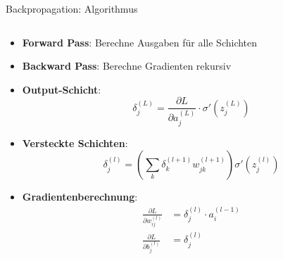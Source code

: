 \documentclass[aspectratio=1610, xcolor=dvipsnames, 9pt]{beamer}
\begin{document}
      \begin{frame}{Backpropagation: Algorithmus}
        \begin{columns}
          \begin{column}{1\textwidth}
            \begin{itemize}
              \item \textbf{Forward Pass}: Berechne Ausgaben für alle Schichten
              \item \textbf{Backward Pass}: Berechne Gradienten rekursiv
              \item \textbf{Output-Schicht}:
              \begin{equation}
                \delta_j^{(L)} = \frac{\partial L}{\partial a_j^{(L)}} \cdot \sigma'(z_j^{(L)})
              \end{equation}
              \item \textbf{Versteckte Schichten}:
              \begin{equation}
                \delta_j^{(l)} = \left(\sum_{k} \delta_k^{(l+1)} w_{jk}^{(l+1)}\right) \sigma'(z_j^{(l)})
              \end{equation}
              \item \textbf{Gradientenberechnung}:
              \begin{align}
                \frac{\partial L}{\partial w_{ij}^{(l)}} &= \delta_j^{(l)} \cdot a_i^{(l-1)} \\
                \frac{\partial L}{\partial b_j^{(l)}} &= \delta_j^{(l)}
              \end{align}
            \end{itemize}
          \end{column}
        \end{columns}
      \end{frame}
\end{document}
